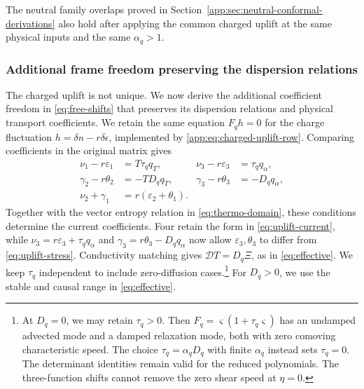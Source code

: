The neutral family overlaps proved in
Section~\ref{app:sec:neutral-conformal-derivations} also hold after
applying the common charged uplift at the same physical inputs and
the same $\alpha_q>1$.


\subsubsection{Additional frame freedom preserving the dispersion relations}
\label{app:sec:family-hierarchy}
The charged uplift is not unique. We now derive the additional coefficient
freedom in \eqref{eq:free-shifts} that preserves its dispersion relations
and physical transport coefficients. We retain the same
equation $F_qh=0$ for the charge fluctuation $h=\delta n-r\delta\epsilon$,
implemented by \eqref{app:eq:charged-uplift-row}. Comparing coefficients
in the original matrix gives
\begin{align}\label{app:eq:hierarchy-five}
 \nu_1-r\varepsilon_1&=T\tau_qq_T,&
 \nu_3-r\varepsilon_3&=\tau_qq_\alpha,\\
 \gamma_2-r\theta_2&=-TD_qq_T,&
 \gamma_3-r\theta_3&=-D_qq_\alpha,\nonumber\\
 \nu_2+\gamma_1&=r(\varepsilon_2+\theta_1).&&\nonumber
\end{align}
Together with the vector entropy relation in \eqref{eq:thermo-domain},
these conditions determine the current coefficients. Four retain the
form in \eqref{eq:uplift-current}, while
$\nu_3=r\varepsilon_3+\tau_qq_\alpha$ and
$\gamma_3=r\theta_3-D_qq_\alpha$ now allow $\varepsilon_3,\theta_3$
to differ from \eqref{eq:uplift-stress}.
Conductivity matching gives $\mathcal D T=D_q\Xi$, as in
\eqref{eq:effective}. We keep $\tau_q$ independent to include
zero-diffusion cases.\footnote{\label{fn:independent-charge-relaxation}At
$D_q=0$, we may retain $\tau_q>0$. Then
$F_q=\varsigma(1+\tau_q\varsigma)$ has an undamped advected mode and
a damped relaxation mode, both with zero comoving characteristic speed.
The choice $\tau_q=\alpha_qD_q$ with finite $\alpha_q$ instead sets
$\tau_q=0$. The determinant identities remain valid for the reduced
polynomials. The three-function shifts cannot remove the zero shear
speed at $\eta=0$.}
For $D_q>0$, we use the stable and causal range
in \eqref{eq:effective}.

